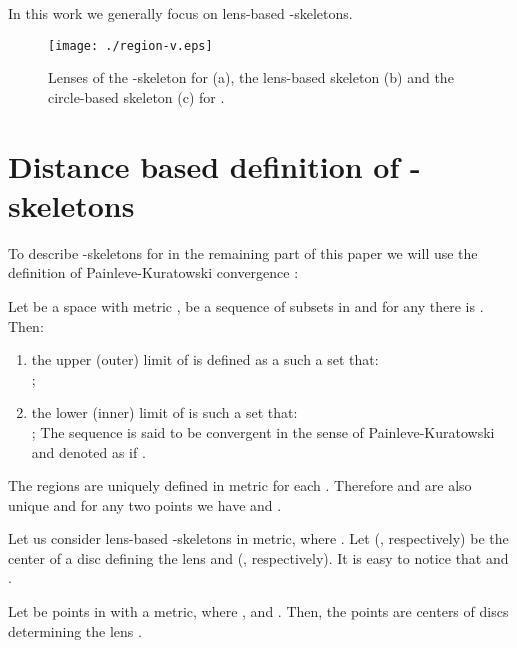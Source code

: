 \documentclass[11pt]{llncs}
\begin{document}
In this work we generally focus on lens-based -skeletons.\\ 

\begin{figure}[htbp]
\centering
\texttt{[image: ./region-v.eps]}
\caption{Lenses of the -skeleton for  (a), the lens-based skeleton 
(b) and the circle-based skeleton (c) for .}
\label{fig:region}
\end{figure}








\section{Distance based definition of -skeletons }
\label{distancebased}



To describe -skeletons for  in the remaining part of this paper 
we will use the definition of Painleve-Kuratowski convergence \cite{k66}: 

\begin{definition}
\label{kuratowskiconv}
Let  be a space with metric ,  be a sequence 
of subsets in  and for any  there is . Then:
\begin{enumerate}
\item
the upper (outer) limit  of  
is defined as a such a set that:\\
;
\item
the lower (inner) limit 
 of  is such a set that:\\
;
The sequence  is said to be convergent in the sense of Painleve-Kuratowski
and denoted as  
if .
\end{enumerate}
\end{definition}







The regions  are uniquely defined in  metric for each .
Therefore  and 
 are also unique and
for any two points  we have 
 and 
.


Let us consider lens-based -skeletons in  metric, where . 
Let  (, respectively) be the center of a disc defining the lens  
and   (, 
respectively). 
It is easy to notice that  
and  .

\begin{lemma}
\label{lemata}
Let  be points in  with a  metric, where ,
 and 
 . 
Then, the points  are centers of discs determining the lens .
\end{lemma}
\end{document}
